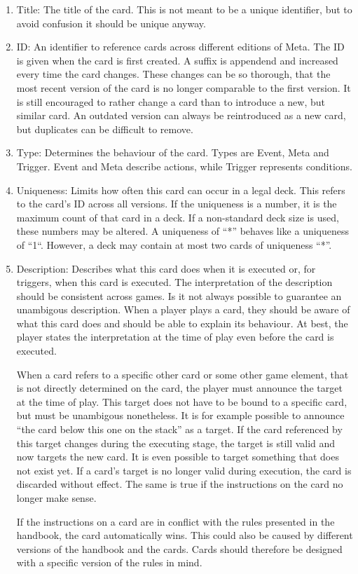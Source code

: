 \documentclass[a4paper,10pt]{article}
\begin{document}
 \begin{enumerate}
  \item Title: The title of the card. This is not meant to be a unique identifier, but to
avoid confusion it should be unique anyway.
  \item ID: An identifier to reference cards across different editions of Meta. The ID is
given when the card is first created. A suffix is appendend and increased every time the
card changes. These changes can be so thorough, that the most recent version of the card
is no longer comparable to the first version. It is still encouraged to rather change a
card than to introduce a new, but similar card. An outdated version can always be
reintroduced as a new card, but duplicates can be difficult to remove. 
  \item Type: Determines the behaviour of the card. Types are Event, Meta and Trigger.
Event and Meta describe actions, while Trigger represents conditions.
  \item Uniqueness: Limits how often this card can occur in a legal deck. This refers to
the card's ID across all versions. If the uniqueness is a number, it is the maximum count
of that card in a deck. If a non-standard deck size is used, these numbers may be
altered. A uniqueness of ``*'' behaves like a uniqueness of ``1``. However, a deck may
contain at most two cards of uniqueness ``*''.
  \item Description: Describes what this card does when it is executed or, for triggers,
when this card is executed. The interpretation of the description should be consistent
across games. Is it not always possible to guarantee an unambigous description. When a
player plays a card, they should be aware of what this card does and should be able to
explain its behaviour. At best, the player states the interpretation at the time of play
even before the card is executed.

When a card refers to a specific other card or some other game element, that is not
directly determined on the card, the player must announce the target at the time of play.
This target does not have to be bound to a specific card, but must be unambigous
nonetheless. It is for example possible to announce ``the card below this one on the
stack'' as a target. If the card referenced by this target changes during the executing
stage, the target is still valid and now targets the new card. It is even possible to
target something that does not exist yet. If a card's target is no longer valid during
execution, the card is discarded without effect. The same is true if the instructions on
the card no longer make sense.

If the instructions on a card are in conflict with the rules presented in the handbook,
the card automatically wins. This could also be caused by different versions of
the handbook and the cards. Cards should therefore be designed with a specific version of
the rules in mind.

 \end{enumerate}
\end{document}
